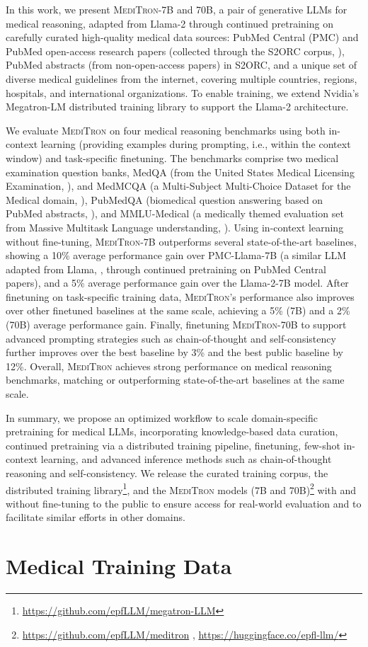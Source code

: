 \documentclass{article}
\newcommand{\llama}{\textnormal{Llama}}
\newcommand{\mtron}{\textsc{MediTron}\xspace}
\newcommand{\mtrona}{\textsc{MediTron-7B}\xspace}
\newcommand{\mtronb}{\textsc{MediTron-70B}\xspace}
\begin{document}
In this work, we present \mtron-7B and 70B, a pair of generative LLMs for medical reasoning, adapted from \llama-2 \citep{llama2} through continued pretraining on carefully curated high-quality medical data sources: PubMed Central (PMC) and PubMed open-access research papers (collected through the S2ORC corpus, \citealp{lo-wang-2020-s2orc}), PubMed abstracts (from non-open-access papers) in S2ORC, and a unique set of diverse medical guidelines from the internet, covering multiple countries, regions, hospitals, and international organizations. To enable training, we extend Nvidia's Megatron-LM distributed training library to support the \llama-2 architecture.

We evaluate \mtron on four medical reasoning benchmarks using both in-context learning (providing examples during prompting, i.e., within the context window) and task-specific finetuning. The benchmarks comprise two medical examination question banks, MedQA (from the United States Medical Licensing Examination, \citealp{medqa}), and MedMCQA (a Multi-Subject Multi-Choice Dataset for the Medical domain, \citealp{medmcqa}), PubMedQA (biomedical question answering based on PubMed abstracts, \citealp{jin-etal-2019-pubmedqa}), and MMLU-Medical (a medically themed evaluation set from Massive Multitask Language understanding, \citealp{hendrycks2021mmlu}). 
Using 
in-context learning without fine-tuning, \mtrona outperforms several state-of-the-art baselines, showing a 10\% average performance gain over PMC-\llama-7B (a similar LLM adapted from \llama, \citealp{llama}, through continued pretraining on PubMed Central papers), and a 5\% average performance gain over the \llama-2-7B model.  
After finetuning on task-specific training data, \mtron's performance also improves over other finetuned baselines at the same scale, achieving a 5\% (7B) and a 2\% (70B) average performance gain. Finally, finetuning \mtronb to support advanced prompting strategies such as chain-of-thought and self-consistency further improves  
over the best baseline by 3\% and the best public baseline by 12\%. Overall, \mtron achieves strong performance on medical reasoning benchmarks, matching or outperforming state-of-the-art baselines at the same scale.

In summary, we propose an optimized workflow to scale domain-specific pretraining for medical LLMs, incorporating knowledge-based data curation, continued pretraining via a distributed training pipeline, finetuning, few-shot in-context learning, and advanced inference methods such as chain-of-thought reasoning and self-consistency. We release the curated training corpus, the distributed training library\footnote{\url{https://github.com/epfLLM/megatron-LLM}}, and the \mtron models (7B and 70B)\footnote{\url{https://github.com/epfLLM/meditron} , \url{https://huggingface.co/epfl-llm/}} with and without fine-tuning to the public to ensure access for real-world evaluation and to facilitate similar efforts in other domains. \section{Medical Training Data}
\label{sec:2-data-collection}
\end{document}

